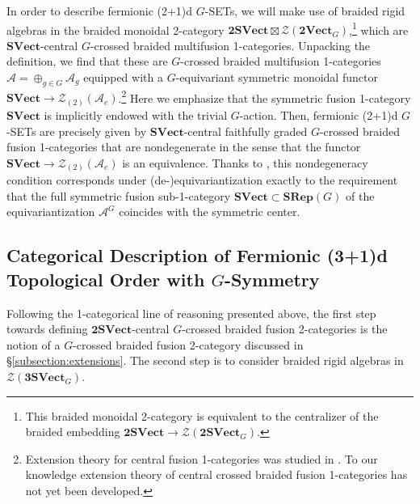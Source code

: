 \documentclass[11pt,reqno]{amsart}
\newcommand{\tVect}{\mathbf{2Vect}}
\newcommand{\SVect}{\mathbf{SVect}}
\newcommand{\tSVect}{\mathbf{2SVect}}
\newcommand{\cZ}{\mathcal{Z}}
\numberwithin{equation}{section}
\theoremstyle{plain}
\theoremstyle{definition}
\begin{document}
In order to describe fermionic (2+1)d $G$-SETs, we will make use of braided rigid algebras in the braided monoidal 2-category $\tSVect\boxtimes\cZ(\tVect_G)$,\footnote{This braided monoidal 2-category is equivalent to the centralizer of the braided embedding $\tSVect\rightarrow\cZ(\tSVect_G)$.} which are $\SVect$-central $G$-crossed braided multifusion 1-categories.
Unpacking the definition, we find that these are $G$-crossed braided multifusion 1-categories $\mathcal{A} = \oplus_{g\in G}\mathcal{A}_g$ equipped with a $G$-equivariant symmetric monoidal functor $\mathbf{SVect}\rightarrow \mathcal{Z}_{(2)}(\mathcal{A}_e)$.\footnote{Extension theory for central fusion 1-categories was studied in \cite{jones2022extension}. To our knowledge extension theory of central crossed braided fusion 1-categories has not yet been developed.}
Here we emphasize that the symmetric fusion 1-category $\mathbf{SVect}$ is implicitly endowed with the trivial $G$-action.
Then, fermionic (2+1)d $G$-SETs are precisely given by $\SVect$-central faithfully graded $G$-crossed braided fusion 1-categories that are nondegenerate in the sense that the functor $\mathbf{SVect}\rightarrow \mathcal{Z}_{(2)}(\mathcal{A}_e)$ is an equivalence.
Thanks to \cite[Proposition 4.56]{DGNO}, this nondegeneracy condition corresponds under (de-)equivariantization exactly to the requirement that the full symmetric fusion sub-1-category $\mathbf{SVect}\subset\mathbf{SRep}(G)$ of the equivariantization $\mathcal{A}^G$ coincides with the symmetric center.

\subsection{Categorical Description of Fermionic (3+1)d Topological Order with $G$-Symmetry}\label{subsection:GTQFT}

Following the 1-categorical line of reasoning presented above, the first step towards defining $\mathbf{2SVect}$-central $G$-crossed braided fusion 2-categories is the notion of a $G$-crossed braided fusion 2-category discussed in \S\ref{subsection:extensions}.
The second step is to consider braided rigid algebras in $\cZ(\mathbf{3SVect}_G)$.
\end{document}
